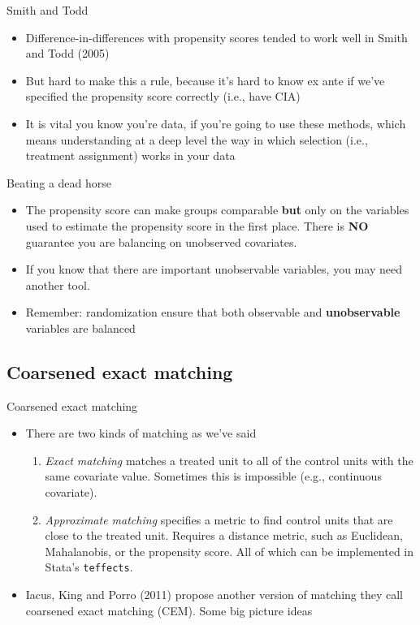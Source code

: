 \documentclass{beamer}
\begin{document}
\begin{frame}{Smith and Todd}

\begin{itemize}
\item Difference-in-differences with propensity scores tended to work well in Smith and Todd (2005)
\item But hard to make this a rule, because it's hard to know ex ante if we've specified the propensity score correctly (i.e., have CIA)
\item It is vital you know you're data, if you're going to use these methods, which means understanding at a deep level the way in which selection (i.e., treatment assignment) works in your data
\end{itemize}

\end{frame}
\begin{frame}{Beating a dead horse}

\begin{itemize}
	\item The propensity score can make groups comparable \textbf{but} only on the variables used to estimate the propensity score in the first place.  There is \textbf{NO} guarantee you are balancing on unobserved covariates.
	\item If you know that there are important unobservable variables, you may need another tool.
	\item Remember: randomization ensure that both observable and \textbf{unobservable} variables are balanced
\end{itemize}
\end{frame}


\subsection{Coarsened exact matching}



\begin{frame}{Coarsened exact matching}
	
\begin{itemize}
\item There are two kinds of matching as we've said
	\begin{enumerate}
	\item \emph{Exact matching} matches a treated unit to all of the control units with the same covariate value. Sometimes this is impossible (e.g., continuous covariate). 
	\item \emph{Approximate matching} specifies a metric to find control units that are close to the treated unit. Requires a distance metric, such as Euclidean, Mahalanobis, or the propensity score.  All of which can be implemented in Stata's \texttt{teffects}.
	\end{enumerate}
\item 	Iacus, King and Porro (2011) propose another version of matching they call coarsened exact matching (CEM). Some big picture ideas
\end{itemize}
\end{frame}
\end{document}
